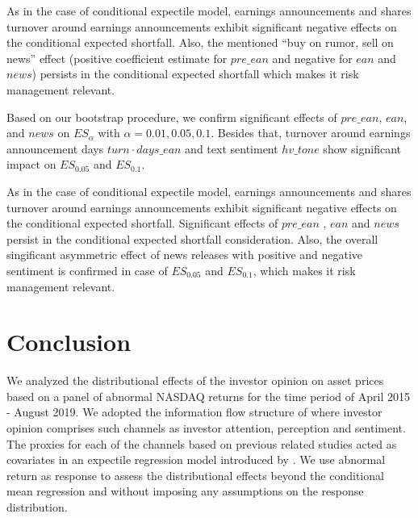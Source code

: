 \documentclass[]{article}
\begin{document}
As in the case of conditional expectile model, earnings announcements and shares turnover around earnings announcements exhibit significant negative effects on the conditional expected shortfall. Also, the mentioned ``buy on rumor, sell on news'' effect (positive coefficient estimate for \(pre\_ean\) and negative for \(ean\) and \(news\)) persists in the conditional expected shortfall which makes it risk management relevant.

Based on our bootstrap procedure, we confirm significant effects of \(pre\_ean\), \(ean\), and \(news\) on \(ES_\alpha\) with \(\alpha=0.01,0.05,0.1\). Besides that, turnover around earnings announcement days \(turn\cdot days\_ean\) and text sentiment \(hv\_tone\) show significant impact on \(ES_{0.05}\) and \(ES_{0.1}\).

As in the case of conditional expectile model, earnings announcements and shares turnover around earnings announcements exhibit significant negative effects on the conditional expected shortfall. Significant effects of \(pre\_ean\) , \(ean\) and $news$ persist in the conditional expected shortfall consideration. Also, the overall singificant asymmetric effect of news releases with positive and negative sentiment is confirmed in case of $ES_{0.05}$ and  $ES_{0.1}$, which makes it risk management relevant.

\hypertarget{conclusion}{%
\section{Conclusion}\label{conclusion}}

We analyzed the distributional effects of the investor opinion on asset prices based on a panel of abnormal NASDAQ returns for the time period of April 2015 - August 2019. We adopted the information flow structure of \cite{Su2021} where investor opinion comprises such channels as investor attention, perception and sentiment. The proxies for each of the channels based on previous related studies acted as covariates in an expectile regression model introduced by \cite{Newey1987}. We use abnormal return as response to assess the distributional effects beyond the conditional mean regression and without imposing any assumptions on the response distribution. 
\end{document}
